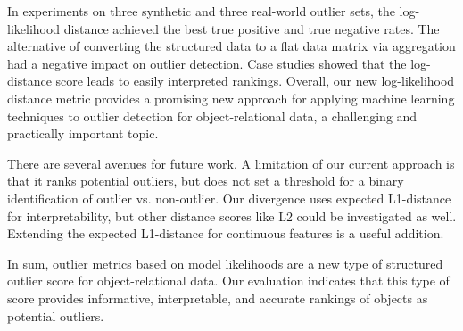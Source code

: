 \documentclass[conference]{IEEEtran}
\begin{document}
In experiments on three synthetic and three real-world outlier sets, the log-likelihood distance achieved the best true positive and true negative rates. The alternative of converting the structured data to a flat data matrix via aggregation had a negative impact on outlier detection. Case studies showed that the log-distance score leads to easily interpreted rankings.
%
Overall, our new log-likelihood distance metric provides a promising new approach for applying machine learning techniques to outlier detection for object-relational data, a challenging and practically important topic. 

 							
								There are several avenues for future work.  A limitation of our current approach is that it ranks potential outliers, but does not set a threshold for a binary identification of outlier vs. non-outlier. Our divergence uses expected L1-distance for interpretability, but other distance scores like L2 could be investigated as well. Extending the expected L1-distance for continuous features is a useful addition. 
								
								
								In sum, outlier metrics based on model likelihoods are a new type of structured outlier score for object-relational data. Our evaluation indicates that this type of score provides informative, interpretable, and accurate rankings of objects as potential outliers.
								
								
								
								
							
\end{document}
